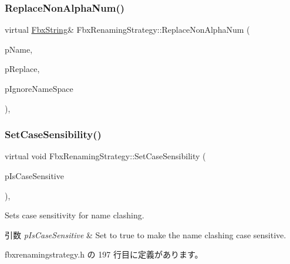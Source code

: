 \subsubsection{\texorpdfstring{Replace\+Non\+Alpha\+Num()}{ReplaceNonAlphaNum()}}
{\footnotesize\ttfamily virtual \hyperlink{class_fbx_string}{Fbx\+String}\& Fbx\+Renaming\+Strategy\+::\+Replace\+Non\+Alpha\+Num (\begin{DoxyParamCaption}\item[{\hyperlink{class_fbx_string}{Fbx\+String} \&}]{p\+Name,  }\item[{const char $\ast$}]{p\+Replace,  }\item[{bool}]{p\+Ignore\+Name\+Space }\end{DoxyParamCaption})\hspace{0.3cm}{\ttfamily [protected]}, {\ttfamily [virtual]}}

\mbox{\label{class_fbx_renaming_strategy_a4ffe010b34e4040da2525db5fcaa4f45}} 
\subsubsection{\texorpdfstring{Set\+Case\+Sensibility()}{SetCaseSensibility()}}
{\footnotesize\ttfamily virtual void Fbx\+Renaming\+Strategy\+::\+Set\+Case\+Sensibility (\begin{DoxyParamCaption}\item[{bool}]{p\+Is\+Case\+Sensitive }\end{DoxyParamCaption})\hspace{0.3cm}{\ttfamily [inline]}, {\ttfamily [virtual]}}

Sets case sensitivity for name clashing. 
\begin{DoxyParams}{引数}
{\em p\+Is\+Case\+Sensitive} & Set to {\ttfamily true} to make the name clashing case sensitive. \\
\hline
\end{DoxyParams}


 fbxrenamingstrategy.\+h の 197 行目に定義があります。

\mbox{\label{class_fbx_renaming_strategy_a71f4af04239a7d159f4f049080616356}} 
